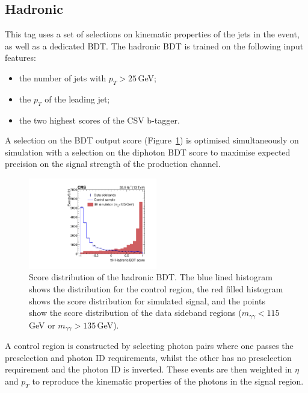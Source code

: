 \subsection{\ttH Hadronic}
This tag uses a set of selections on kinematic properties of the jets in the event, as well as a dedicated BDT. The \ttH hadronic BDT is trained on the following input features:
\begin{itemize}[noitemsep]
    \item the number of jets with $p_{T} > 25$\,GeV;
    \item the $p_{T}$ of the leading jet;
    \item the two highest scores of the CSV b-tagger.
\end{itemize}
A selection on the BDT output score (Figure~\ref{fig:event_categorisaton:tth_hadronic_bdt}) is optimised simultaneously on simulation with a selection on the diphoton BDT score to maximise expected precision on the signal strength of the \ttH production channel. 
\begin{figure}[h!]
    \centering
    \includegraphics[width=0.5\textwidth]{figures/event_selection/CMS-HIG-16-040_Figure_006.pdf}
    \caption{Score distribution of the hadronic \ttH BDT. The blue lined histogram shows the distribution for the control region, the red filled histogram shows the score distribution for simulated signal, and the points show the score distribution of the data sideband regions ($m_{\gamma\gamma} < 115$\,GeV or $m_{\gamma\gamma} > 135$\,GeV).}
        \label{fig:event_categorisaton:tth_hadronic_bdt}
\end{figure}

A control region is constructed by selecting photon pairs where one passes the preselection and photon ID requirements, whilst the other has no preselection requirement and the photon ID is inverted.
These events are then weighted in $\eta$ and $p_T$ to reproduce the kinematic properties of the photons in the signal region.

